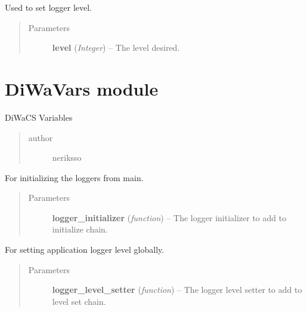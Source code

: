 \documentclass[letterpaper,10pt,english]{sphinxmanual}
\begin{document}
\begin{fulllineitems}
\label{diwacs:diwacs.set_logger_level}
Used to set logger level.
\begin{quote}\begin{description}
\item[{Parameters}] \leavevmode
\textbf{level} (\emph{Integer}) -- The level desired.

\end{description}\end{quote}

\end{fulllineitems}



\section{DiWaVars module}
\label{diwavars:module-diwavars}\label{diwavars:diwavars-module}\label{diwavars::doc}
DiWaCS Variables
\begin{quote}\begin{description}
\item[{author}] \leavevmode
neriksso

\end{description}\end{quote}

\begin{fulllineitems}
\label{diwavars:diwavars.add_logger_initializer}
For initializing the loggers from main.
\begin{quote}\begin{description}
\item[{Parameters}] \leavevmode
\textbf{logger\_initializer} (\emph{function}) -- The logger initializer to add to initialize chain.

\end{description}\end{quote}

\end{fulllineitems}


\begin{fulllineitems}
\label{diwavars:diwavars.add_logger_level_setter}
For setting application logger level globally.
\begin{quote}\begin{description}
\item[{Parameters}] \leavevmode
\textbf{logger\_level\_setter} (\emph{function}) -- The logger level setter to add to level set chain.

\end{description}\end{quote}

\end{fulllineitems}
\end{document}

